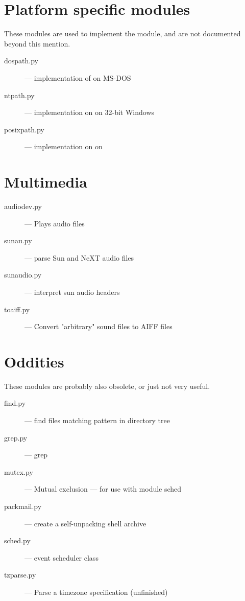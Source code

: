 \section{Platform specific modules}


These modules are used to implement the  module, and
are not documented beyond this mention.

\begin{description}
\item[dospath.py]
--- implementation of  on MS-DOS

\item[ntpath.py]
--- implementation on  on 32-bit Windows

\item[posixpath.py]
--- implementation on  on \POSIX{}
\end{description}


\section{Multimedia}

\begin{description}
\item[audiodev.py]
--- Plays audio files

\item[sunau.py]
--- parse Sun and NeXT audio files

\item[sunaudio.py]
--- interpret sun audio headers

\item[toaiff.py]
--- Convert "arbitrary" sound files to AIFF files
\end{description}


\section{Oddities}

These modules are probably also obsolete, or just not very useful.

\begin{description}
\item[find.py]
--- find files matching pattern in directory tree

\item[grep.py]
--- grep

\item[mutex.py]
--- Mutual exclusion --- for use with module sched

\item[packmail.py]
--- create a self-unpacking \UNIX{} shell archive

\item[sched.py]
--- event scheduler class

\item[tzparse.py]
--- Parse a timezone specification (unfinished)
\end{description}


